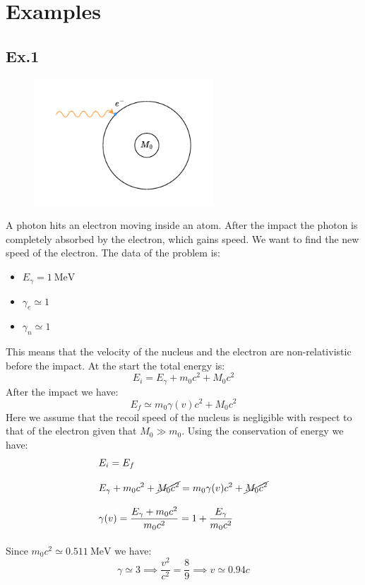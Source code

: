 \section{Examples}
\subsection{Ex.1}
\begin{figure}[H]
  \centering
  \includegraphics[width=0.6\textwidth]{res/svg/photon_absorbtion.drawio}
\end{figure}
A photon hits an electron moving inside an atom. After the impact the photon is completely absorbed by the electron, which gains speed. We want to find the new speed of the electron. The data of the problem is:
\begin{itemize}
  \item $E_\gamma = \qty{1}{\mega\electronvolt}$
  \item $\gamma_e \simeq 1$
  \item $\gamma_n \simeq 1$
\end{itemize}
This means that the velocity of the nucleus and the electron are non-relativistic before the impact. At the start the total energy is:
\begin{equation}
  E_i = E_\gamma + m_0c^2 + M_0c^2
\end{equation}
After the impact we have:
\begin{equation}
  E_f \simeq m_0\gamma (v) c^2 + M_0c^2
\end{equation}
Here we assume that the recoil speed of the nucleus is negligible with respect to that of the electron given that $M_0 \gg m_0$. Using the conservation of energy we have:
\begin{equation}
  \begin{split}
    &E_i = E_f \\[8pt]
    &E_\gamma + m_0c^2 + \cancel{M_0c^2} = m_0\gamma (v) c^2 + \cancel{M_0c^2} \\[8pt]
    &\gamma (v) = \dfrac{E_\gamma + m_0c^2}{m_0c^2} = 1 + \dfrac{E_\gamma}{m_0c^2} \\[8pt]
  \end{split}
\end{equation}
Since $m_0c^2 \simeq \qty{0.511}{\mega\electronvolt}$ we have:
\begin{equation}
  \gamma \simeq 3 \implies \dfrac{v^2}{c^2} = \dfrac{8}{9} \implies v \simeq 0.94c
\end{equation}

